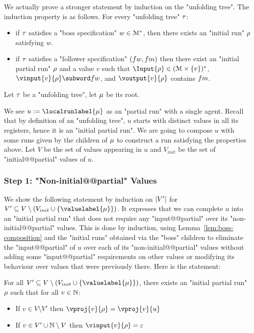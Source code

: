 	We actually prove a stronger statement by induction on the "unfolding tree".
	The induction property is as follows. For every "unfolding tree" $\tau$:
	\begin{itemize}
		\item if $\tau$ satisfies a "boss specification" $w \in \mathcal{M}^*$, then there exists an "initial run" $\rho$ satisfying $w$.
		\item if $\tau$ satisfies a "follower specification" $(\followwordspec, \followmessagespec)$ then there exist an "initial partial run" $\rho$ and a value $v$ such that $\Input{\run} \in (\messages\times \set{v})^*$, $\vinput{v}{\run} \subword \followwordspec$, and $\voutput{v}{\run}$ contains $\followmessagespec$.
	\end{itemize}
	
	Let $\tau$ be a "unfolding tree", let $\mu$ be its root.
	
	We see $u := \localrunlabel{\node}$ as an "partial run" with a single agent. Recall that by definition of an "unfolding tree", $u$ starts with distinct values in all its registers, hence it is an "initial partial run".
	We are going to compose $u$ with some runs given by the children of $\mu$ to construct a run satisfying the properties above.
	Let $V$ be the set of values appearing in $u$ and $V_{init}$ be the set of "initial@@partial" values of $u$.
	
	
	\subsubsection{Step 1: "Non-initial@@partial" Values}
	\label{sec:tree-to-run-step-one}
	
	We show the following statement by induction on $|V'|$ for $V' \subseteq V \setminus (V_{init}\cup \set{\valuelabel{\node}})$. It expresses that we can complete $u$ into an "initial partial run" that does not require any "input@@partial" over its "non-initial@@partial" values. This is done by induction, using Lemma~\ref{lem:boss-composition} and the "initial runs" obtained via the "boss" children to eliminate the "input@@partial" of $u$ over each of its "non-initial@@partial" values without adding some "input@@partial" requirements on other values or modifying its behaviour over values that were previously there.
	Here is the statement:
	
For all $V' \subseteq V \setminus (V_{init}\cup \set{\valuelabel{\node}})$, there exists an "initial partial run" $\rho$ such that for all $v \in \mathbb{N}$:
\begin{itemize}
	\item If $v \in V \setminus V'$ then $\vproj{v}{\run} = \vproj{v}{u}$
	
	\item If $v \in V' \cup \mathbb{N} \setminus V$ then $\vinput{v}{\run} = \epsilon$
\end{itemize}  
	
